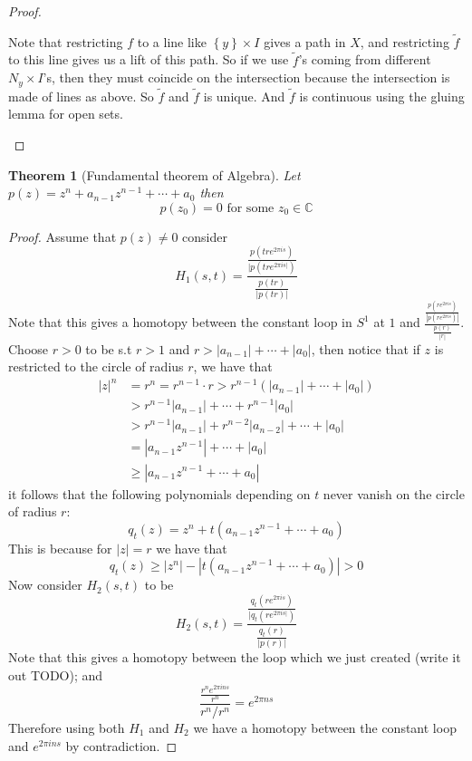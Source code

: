 \documentclass[11pt,a4paper]{article}
\theoremstyle{definition}
\theoremstyle{plain}
\newtheorem{theorem}[definition]{Theorem}
\theoremstyle{remark}
\newcommand{\C}{\mathbb{C}}
\renewcommand{\set}[1]{\left\{ #1 \right\}}
\newcommand{\1}{\mathbbm{1}}
\begin{document}
\begin{proof}
\begin{itemize}
        Note that restricting $f$ to a line like $\set{y} \times I$ gives a path in $X$, and restricting $\tilde f$ to this line gives us a lift of this path. So if we use $\tilde f$'s coming
        from different $N_y \times I$'s, then they must coincide on the intersection because the intersection is made of lines as above. So $\tilde f$ and $\tilde f$ is unique. And $\tilde f$ is continuous 
        using the gluing lemma for open sets. 
    \end{itemize}
\end{proof}

\begin{theorem}[Fundamental theorem of Algebra]
    Let $p(z) = z^n + a_{n-1} z^{n-1} + \cdots + a_0$ then 
    $$p(z_0) = 0 \text{ for some $z_0 \in \C$}$$     
\end{theorem}

\begin{proof}
    Assume that $p(z) \ne 0$ consider 
    $$H_1(s, t) = \frac{\frac{p(tre^{2 \pi i s})}{|p(tre^{2\pi i s|})}}{\frac{p(tr)}{|p(tr)|}}$$
    Note that this gives a homotopy between the constant loop  in $S^1$ at $1$ and $\frac{\frac{p(re^{2\pi i s})}{|p(re^{2 \pi i s})|}}{\frac{p(r)}{|r|}}$. Choose $r > 0$ 
    to be s.t $r > 1$ and $r > |a_{n-1}| + \cdots + |a_0|$, then notice that if $z$ is restricted to the circle of radius $r$, we have that 
    \begin{align*}
        |z|^n &= r^n = r^{n-1} \cdot r > r^{n-1} (|a_{n-1}| + \cdots + |a_0|) \\
        &> r^{n-1} |a_{n-1}| + \cdots + r^{n-1} |a_0| \\
        &> r^{n-1} |a_{n-1}| + r^{n-2} |a_{n-2}| + \cdots + |a_0| \\
        &= |a_{n-1} z^{n-1}| + \cdots + |a_0| \\
        &\ge |a_{n-1} z^{n-1} + \cdots + a_0|
    \end{align*} 
    it follows that the following polynomials depending on $t$ never vanish on the circle of radius $r$: 
    $$q_t(z) = z^n + t(a_{n-1} z^{n-1} + \cdots + a_0)$$
    This is because for $|z| = r$ we have that 
    $$q_t(z) \ge |z^n| - |t(a_{n-1} z^{n-1} + \cdots + a_0)| > 0$$
    Now consider $H_2(s,t)$ to be 
    $$H_2(s, t) = \frac{\frac{q_t(re^{2 \pi i s})}{|q_t(re^{2\pi i s|})}}{\frac{q_t(r)}{|p(r)|}}$$
    Note that this gives a homotopy between the loop which we just created (write it out TODO); and 
    $$\frac{\frac{r^n e^{2 \pi i n s}}{r^n}}{r^n/r^n} = e^{2 \pi n s}$$
    Therefore using both $H_1$ and $H_2$ we have a homotopy between the constant loop and $e^{2 \pi i ns}$ by contradiction. 
\end{proof}
\end{document}

